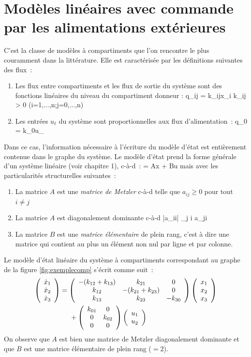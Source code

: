 \section{Modèles linéaires avec commande par les alimentations 
extérieures}

C'est la classe de modèles à compartiments que l'on rencontre le plus
couramment dans la littérature. Elle est caractérisée par les définitions
suivantes des flux~:
\begin{enumerate}
\item Les flux entre compartiments et les flux de sortie du système sont 
des fonctions linéaires du
niveau du compartiment donneur :
\eqnn
q_{ij} = k_{ij}x_i \hspace{1cm} k_{ij} > 0 \hspace{1cm} (i=1,...,n;j=0,...,n)
\eeqnn
\item Les entrées $u_{\ell}$ du système sont proportionnelles aux flux
d'alimentation~: 
\eqnn
q_{0\ell} = k_{0\ell}u_{\ell} 
\eeqnn
\end{enumerate}
Dans ce cas, l'information nécessaire à l'écriture du modèle d'état 
est entièrement contenue dans le graphe du système. Le modèle d'état
prend la forme générale d'un système linéaire (voir chapitre 1), c-à-d~:
\eqnn
{} = Ax + Bu
\eeqnn
mais avec les particularités structurelles suivantes~:
\begin{enumerate}
\item La matrice $A$ est une {\em matrice de Metzler} c-à-d  telle que $a_{ij} 
\geq 0$ 
pour tout $i \neq j$
\item La matrice $A$ est diagonalement dominante c-à-d
\eqnn
|a_{ii}| \geq \sum_{j \neq i} a_{ji} 
\eeqnn
\item La matrice $B$ est une {\em matrice élémentaire} de plein rang, c'est à
dire une matrice qui contient au plus un élément non nul par ligne et par
colonne.
\end{enumerate}

\begin{exemple}

Le modèle d'état linéaire du système à compartiments
correspondant au graphe de la figure \ref{fig:exemplecomp} 
s'écrit comme suit~:
\begin{equation} \begin{split}
\bma{c} \dot x_1 \\ \dot x_2 \\ \dot x_3 \ema &= 
\bma{ccc} -(k_{12} + k_{13}) & k_{21} & 0 \\ 
k_{12} & -(k_{21} + k_{23}) & 0 \\ k_{13} & k_{23} & - k_{30} \ema
\bma{c} x_1 \\ x_2 \\ x_3 \ema \\ &\hd
+ \bma{cc} k_{01} & 0 \\ 0 & k_{02} \\ 0 & 0 \ema
\bma{c} u_1 \\ u_2 \ema
\end{split} \end{equation}
On observe que $A$ est bien une matrice de Metzler diagonalement
dominante et que $B$ est une matrice élémentaire de plein rang ($= 2$).
\cqfd
\end{exemple}

